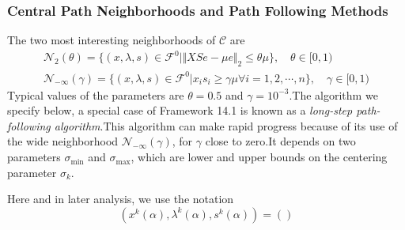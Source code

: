 \subsubsection{Central Path Neighborhoods and Path Following Methods}
The two most interesting neighborhoods of $\mathcal{C}$ are
\begin{align}
    \mathcal{N}_2(\theta) = \{(x, \lambda, s)\in\mathcal{F}^0 | \Vert XSe - \mu e \Vert_2 \leq \theta\mu \} , \quad \theta\in [0, 1) \tag{14.17}\label{ipm: 14.17}\\
        \mathcal{N}_{-\infty}(\gamma) = \{(x, \lambda, s)\in\mathcal{F}^0 | x_i s_i\geq\gamma\mu \forall i = 1,2,\cdots,n  \} , \quad \gamma\in [0, 1) \tag{14.18}\label{ipm: 14.18}
\end{align}
Typical values of the parameters are $\theta = 0.5$ and $\gamma = 10^{-3}$.The algorithm we specify below, a special case
of Framework 14.1 is known as a \textit{long-step path-following algorithm}.This algorithm can make rapid progress because of
its use of the wide neighborhood $\mathcal{N}_{-\infty}(\gamma)$, for $\gamma$ close to zero.It depends on two parameters
$\sigma_{\min}$ and $\sigma_{\max}$, which are lower and upper bounds on the centering parameter $\sigma_k$.
\par Here and in later analysis, we use the notation
\[
    (x^k(\alpha), \lambda^k(\alpha), s^k(\alpha)) = ()
\]

